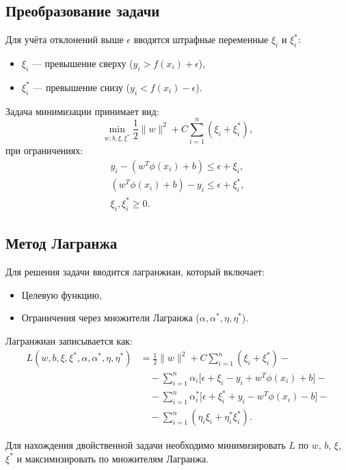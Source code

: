 \subsection{Преобразование задачи}
\par Для учёта отклонений выше \(\epsilon\) вводятся штрафные переменные \(\xi_i\) и \(\xi_i^*\):  
\begin{itemize}
    \item \(\xi_i\) — превышение сверху (\(y_i > f(x_i) + \epsilon\)),
    \item \(\xi_i^*\) — превышение снизу (\(y_i < f(x_i) - \epsilon\)).
\end{itemize}
\par Задача минимизации принимает вид:
\begin{equation*}
    \min_{w, b, \xi, \xi^*} \frac{1}{2} \|w\|^2 + C \sum_{i=1}^n (\xi_i + \xi_i^*),
\end{equation*}
при ограничениях:
\begin{equation*}
\begin{aligned}
    y_i - (w^T \phi(x_i) + b) \leq \epsilon + \xi_i, \\
    (w^T \phi(x_i) + b) - y_i \leq \epsilon + \xi_i^*, \\
    \xi_i, \xi_i^* \geq 0.
\end{aligned}
\end{equation*}

\subsection{Метод Лагранжа}
\par Для решения задачи вводится лагранжиан, который включает:
\begin{itemize}
    \item Целевую функцию,
    \item Ограничения через множители Лагранжа (\(\alpha, \alpha^*, \eta, \eta^*\)).
\end{itemize}
\par Лагранжиан записывается как:
\begin{equation*}
\begin{aligned}
    L(w, b, \xi, \xi^*, \alpha, \alpha^*, \eta, \eta^*) &= \frac{1}{2} \|w\|^2 + C \sum_{i=1}^n (\xi_i + \xi_i^*) - \\
    &\quad - \sum_{i=1}^n \alpha_i \big[ \epsilon + \xi_i - y_i + w^T \phi(x_i) + b \big] - \\
    &\quad - \sum_{i=1}^n \alpha_i^* \big[ \epsilon + \xi_i^* + y_i - w^T \phi(x_i) - b \big] - \\
    &\quad - \sum_{i=1}^n (\eta_i \xi_i + \eta_i^* \xi_i^*).
\end{aligned}
\end{equation*}
\par Для нахождения двойственной задачи необходимо минимизировать \(L\) по \(w\), \(b\), \(\xi\), \(\xi^*\) и максимизировать по множителям Лагранжа.

